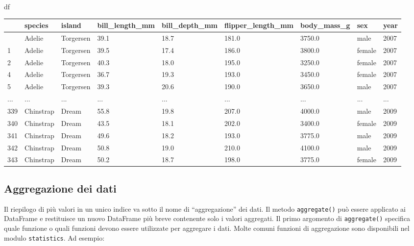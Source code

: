 \documentclass[
  letterpaper,
  krantz2]{{[}./krantz{]}}
\newenvironment{Shaded}{\begin{snugshade}}{\end{snugshade}}
\newcommand{\NormalTok}[1]{\textcolor[rgb]{0.00,0.23,0.31}{#1}}
\begin{document}
\begin{Shaded}
\begin{Highlighting}[]
\NormalTok{df}
\end{Highlighting}
\end{Shaded}

\begin{longtable}[]{@{}lllllllll@{}}
\toprule\noalign{}
& species & island & bill\_length\_mm & bill\_depth\_mm &
flipper\_length\_mm & body\_mass\_g & sex & year \\
\midrule\noalign{}
\endhead
\bottomrule\noalign{}
\endlastfoot
0 & Adelie & Torgersen & 39.1 & 18.7 & 181.0 & 3750.0 & male & 2007 \\
1 & Adelie & Torgersen & 39.5 & 17.4 & 186.0 & 3800.0 & female & 2007 \\
2 & Adelie & Torgersen & 40.3 & 18.0 & 195.0 & 3250.0 & female & 2007 \\
4 & Adelie & Torgersen & 36.7 & 19.3 & 193.0 & 3450.0 & female & 2007 \\
5 & Adelie & Torgersen & 39.3 & 20.6 & 190.0 & 3650.0 & male & 2007 \\
... & ... & ... & ... & ... & ... & ... & ... & ... \\
339 & Chinstrap & Dream & 55.8 & 19.8 & 207.0 & 4000.0 & male & 2009 \\
340 & Chinstrap & Dream & 43.5 & 18.1 & 202.0 & 3400.0 & female &
2009 \\
341 & Chinstrap & Dream & 49.6 & 18.2 & 193.0 & 3775.0 & male & 2009 \\
342 & Chinstrap & Dream & 50.8 & 19.0 & 210.0 & 4100.0 & male & 2009 \\
343 & Chinstrap & Dream & 50.2 & 18.7 & 198.0 & 3775.0 & female &
2009 \\
\end{longtable}

\subsection{Aggregazione dei dati}\label{aggregazione-dei-dati}

Il riepilogo di più valori in un unico indice va sotto il nome di
``aggregazione'' dei dati. Il metodo \texttt{aggregate()} può essere
applicato ai DataFrame e restituisce un nuovo DataFrame più breve
contenente solo i valori aggregati. Il primo argomento di
\texttt{aggregate()} specifica quale funzione o quali funzioni devono
essere utilizzate per aggregare i dati. Molte comuni funzioni di
aggregazione sono disponibili nel modulo \texttt{statistics}. Ad
esempio:
\end{document}
